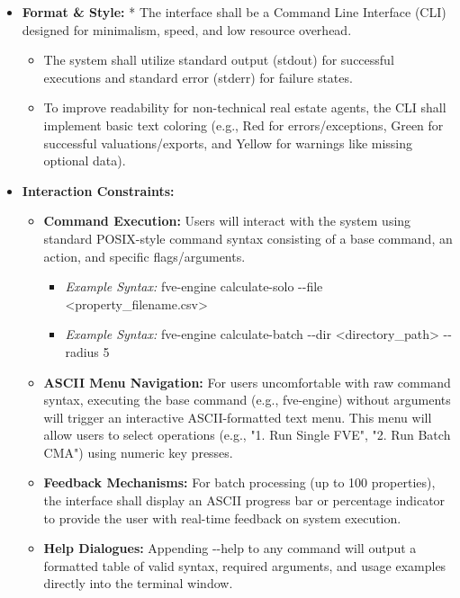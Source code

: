 \documentclass[
]{article}
\begin{document}
\begin{itemize}
\item
  \textbf{Format \& Style:} * The interface shall be a Command Line
  Interface (CLI) designed for minimalism, speed, and low resource
  overhead.

  \begin{itemize}
  \item
    The system shall utilize standard output (stdout) for successful
    executions and standard error (stderr) for failure states.
  \item
    To improve readability for non-technical real estate agents, the CLI
    shall implement basic text coloring (e.g., Red for
    errors/exceptions, Green for successful valuations/exports, and
    Yellow for warnings like missing optional data).
  \end{itemize}
\item
  \textbf{Interaction Constraints:}

  \begin{itemize}
  \item
    \textbf{Command Execution:} Users will interact with the system
    using standard POSIX-style command syntax consisting of a base
    command, an action, and specific flags/arguments.

    \begin{itemize}
    \item
      \emph{Example Syntax:} fve-engine calculate-solo -\/-file
      \textless property\_filename.csv\textgreater{}
    \item
      \emph{Example Syntax:} fve-engine calculate-batch -\/-dir
      \textless directory\_path\textgreater{} -\/-radius 5
    \end{itemize}
  \item
    \textbf{ASCII Menu Navigation:} For users uncomfortable with raw
    command syntax, executing the base command (e.g., fve-engine)
    without arguments will trigger an interactive ASCII-formatted text
    menu. This menu will allow users to select operations (e.g., "1. Run
    Single FVE", "2. Run Batch CMA") using numeric key presses.
  \item
    \textbf{Feedback Mechanisms:} For batch processing (up to 100
    properties), the interface shall display an ASCII progress bar or
    percentage indicator to provide the user with real-time feedback on
    system execution.
  \item
    \textbf{Help Dialogues:} Appending -\/-help to any command will
    output a formatted table of valid syntax, required arguments, and
    usage examples directly into the terminal window.
  \end{itemize}
\end{itemize}
\end{document}
